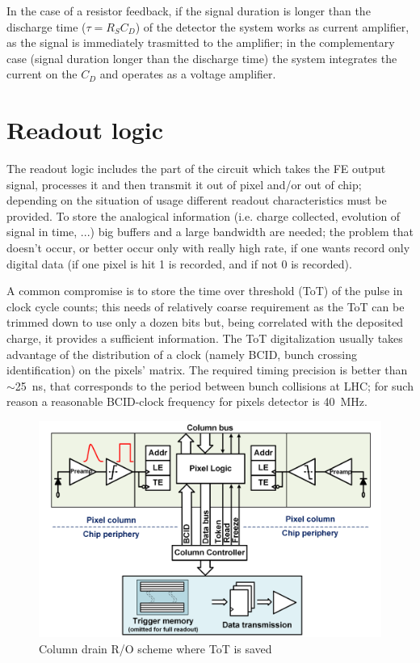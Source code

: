       In the case of a resistor feedback, if the signal duration is longer than the discharge time ($\tau=R_S C_D$) of the detector the system works as current amplifier, as the signal is immediately trasmitted to the amplifier; in the complementary case (signal duration longer than the discharge time) the system integrates the current on the $C_D$ and operates as a voltage amplifier.
      
\section{Readout logic}
   The readout logic includes the part of the circuit which takes the FE output signal, processes it and then transmit it out of pixel and/or out of chip; depending on the situation of usage different readout characteristics must be provided. 
   To store the analogical information (i.e. charge collected, evolution of signal in time, ...) big buffers and a large bandwidth are needed; the problem that doesn't occur, or better occur only with really high rate, if one wants record only digital data (if one pixel is hit 1 is recorded, and if not 0 is recorded). 

   A common compromise is to store the time over threshold (ToT) of the pulse in clock cycle counts; this needs of relatively coarse requirement as the ToT can be trimmed down to use only a dozen bits but, being correlated with the deposited charge, it provides a sufficient information.
   The ToT digitalization usually takes advantage of the distribution of a clock (namely BCID,  bunch crossing identification) on the pixels' matrix. The required timing precision is better than $\sim$\SI{25}{ns}, that corresponds to the period between bunch collisions at LHC; for such reason a reasonable BCID-clock frequency for pixels detector is \SI{40}{MHz}.
   \begin{figure}[h!]
      \centering
      \includegraphics[width=.7\linewidth]{figures/Pixel_detectors/column_drain_RO.png}
      \caption{Column drain R/O scheme where ToT is saved}
      \label{fig:column_drain_RO-like}
   \end{figure}

